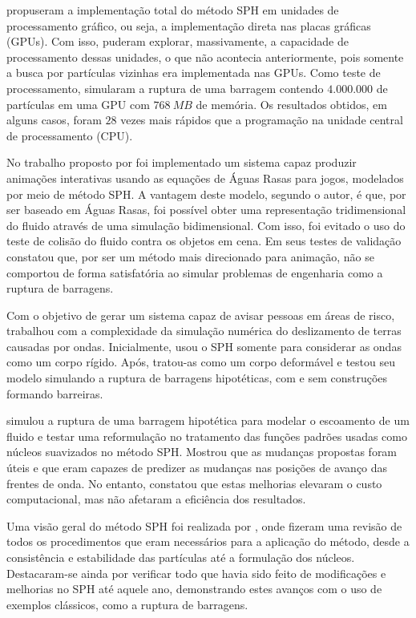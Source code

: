  propuseram a implementação total do método SPH em unidades de processamento gráfico, ou seja, a implementação direta nas placas gráficas (GPUs). Com isso, puderam explorar, massivamente, a capacidade de processamento dessas unidades, o que não acontecia anteriormente, pois somente a busca por partículas vizinhas era implementada nas GPUs. Como teste de processamento, simularam a ruptura de uma barragem contendo $4.000.000$ de partículas em uma GPU com $768 \ MB$ de memória. Os resultados obtidos, em alguns casos, foram $28$ vezes mais rápidos que a programação na unidade central de processamento (CPU).

No trabalho proposto por  foi implementado um sistema capaz produzir animações interativas usando as equações de Águas Rasas para jogos, modelados por meio de método SPH. A vantagem deste modelo, segundo o autor, é que, por ser baseado em Águas Rasas, foi possível obter uma representação tridimensional do fluido através de uma simulação bidimensional. Com isso, foi evitado o uso do teste de colisão do fluido contra os objetos em cena. Em seus testes de validação constatou que, por ser um método mais direcionado para animação, não se comportou de forma satisfatória ao simular problemas de engenharia como a ruptura de barragens.

Com o objetivo de gerar um sistema capaz de avisar pessoas em áreas de risco,  trabalhou com a complexidade da simulação numérica do deslizamento de terras causadas por ondas. Inicialmente, usou o SPH somente para considerar as ondas como um corpo rígido. Após, tratou-as como um corpo deformável e testou seu modelo simulando a ruptura de barragens hipotéticas, com e sem construções formando barreiras. 

 simulou a ruptura de uma barragem hipotética para modelar o escoamento de um fluido e testar uma reformulação no tratamento das funções padrões usadas como núcleos suavizados no método SPH. Mostrou que as mudanças propostas foram úteis e que eram capazes de predizer as mudanças nas posições de avanço das frentes de onda. No entanto, constatou que estas melhorias elevaram o custo computacional, mas não afetaram a eficiência dos resultados.

Uma visão geral do método SPH foi realizada por , onde fizeram uma revisão de todos os procedimentos que eram necessários para a aplicação do método, desde a consistência e estabilidade das partículas até a formulação dos núcleos. Destacaram-se ainda por verificar todo que havia sido feito de modificações e melhorias no SPH até aquele ano, demonstrando estes avanços com o uso de exemplos clássicos, como a ruptura de barragens.

